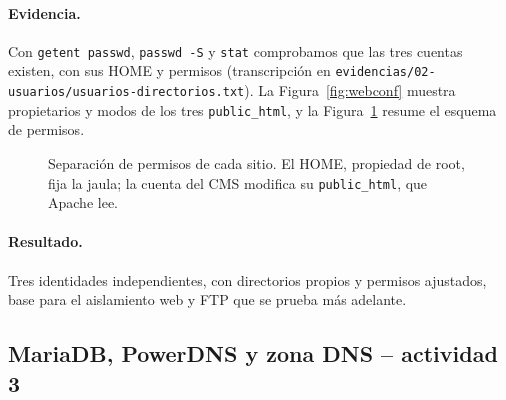 \documentclass[11pt,a4paper]{article}
\newcommand{\evid}[1]{\nolinkurl{evidencias/#1}}
\begin{document}
\paragraph{Evidencia.} Con \texttt{getent passwd}, \texttt{passwd -S} y \texttt{stat} comprobamos que las tres cuentas existen, con sus HOME y permisos (transcripción en \evid{02-usuarios/usuarios-directorios.txt}). La Figura~\ref{fig:webconf} muestra propietarios y modos de los tres \texttt{public\_html}, y la Figura~\ref{fig:jaula} resume el esquema de permisos.
\begin{figure}[htbp]\centering
{}
\caption[Permisos de la jaula y el sitio]{Separación de permisos de cada sitio. El HOME, propiedad de root, fija la jaula; la cuenta del CMS modifica su \texttt{public\_html}, que Apache lee.}\label{fig:jaula}
\end{figure}

\paragraph{Resultado.} Tres identidades independientes, con directorios propios y permisos ajustados, base para el aislamiento web y FTP que se prueba más adelante.

\subsection{MariaDB, PowerDNS y zona DNS -- actividad 3}
\end{document}
